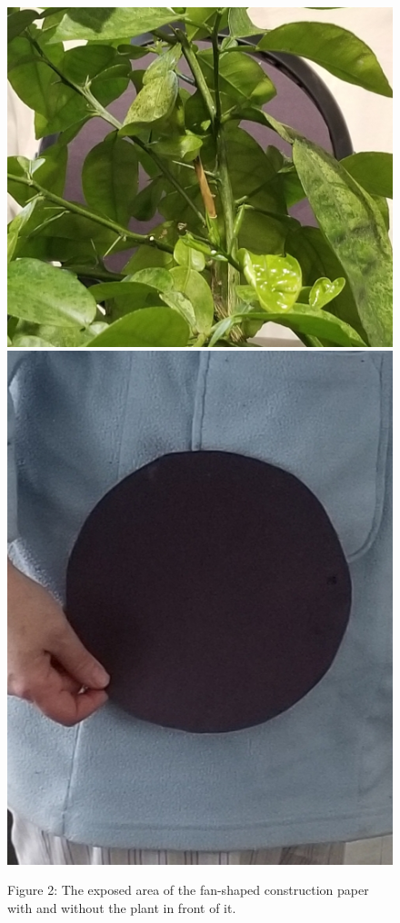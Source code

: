 \documentclass{article}
\begin{document}
\begin{figure}
    \centering
    \includegraphics{Fan.jpg}
    \includegraphics{Fan1.jpg}
    \caption{Figure 2: The exposed area of the fan-shaped construction paper with and without the plant in front of it.}
\end{figure}
\end{document}
